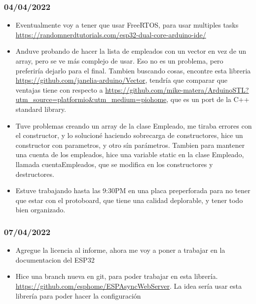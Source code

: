 \documentclass[../informe_krapp.tex]{subfiles}
\begin{document}
\subsubsection{04/04/2022}
\begin{itemize}
	\item Eventualmente voy a tener que usar FreeRTOS, para usar multiples tasks
	      \url{https://randomnerdtutorials.com/esp32-dual-core-arduino-ide/}
	\item Anduve probando de hacer la lista de empleados con un vector en vez
	      de un array, pero se ve más complejo de usar. Eso no es un problema, pero preferiría
	      dejarlo para el final. Tambien buscando cosas, encontre esta libreria
	      \url{https://github.com/janelia-arduino/Vector}, tendría que comparar que ventajas
	      tiene con respecto a
	      \url{https://github.com/mike-matera/ArduinoSTL?utm_source=platformio&utm_medium=piohome},
	      que es un port de la C++ standard library.
	\item Tuve problemas creando un array de la clase Empleado, me tiraba errores
	      con el constructor, y lo solucioné haciendo sobrecarga de constructores, hice
	      un constructor con parametros, y otro sín parámetros.
	      Tambien para mantener una cuenta de los empleados, hice una variable static
	      en la clase Empleado, llamada cuentaEmpleados, que se modifica en los constructores
	      y destructores.
	\item Estuve trabajando hasta las 9:30PM en una placa preperforada
	      para no tener que estar con el protoboard, que tiene una calidad deplorable,
	      y tener todo bien organizado. 
\end{itemize}

\subsubsection{07/04/2022}
\begin{itemize}
	\item Agregue la licencia al informe, ahora me voy a poner a trabajar en la documentacion
	      del ESP32
	\item Hice una branch nueva en git, para poder trabajar en esta librería.
	      \url{https://github.com/esphome/ESPAsyncWebServer}. La idea sería usar esta
	      librería para poder hacer la configuración
\end{itemize}
\end{document}
